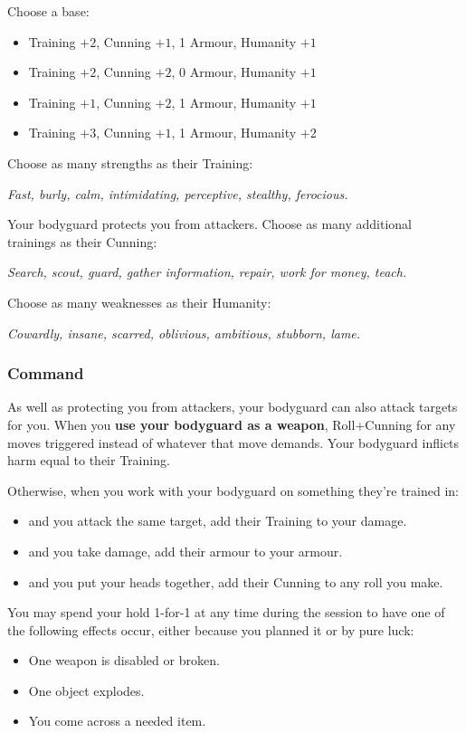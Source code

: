 Choose a base:
\begin{itemize}
\item Training $+2$, Cunning $+1$, 1 Armour, Humanity $+1$
\item Training $+2$, Cunning $+2$, 0 Armour, Humanity $+1$
\item Training $+1$, Cunning $+2$, 1 Armour, Humanity $+1$
\item Training $+3$, Cunning $+1$, 1 Armour, Humanity $+2$
\end{itemize}

Choose as many strengths as their Training:

\textit{Fast, burly, calm, intimidating, perceptive, stealthy, ferocious.}

Your bodyguard protects you from attackers. Choose as many additional trainings as their Cunning:

\textit{Search, scout, guard, gather information, repair, work for money, teach.}

Choose as many weaknesses as their Humanity:

\textit{Cowardly, insane, scarred, oblivious, ambitious, stubborn, lame.}

\subsubsection{Command}\label{sec:Command}
As well as protecting you from attackers, your bodyguard can also attack targets for you. When you \textbf{use your bodyguard as a weapon}, Roll+Cunning for any moves triggered instead of whatever that move demands. Your bodyguard inflicts harm equal to their Training.

Otherwise, when you work with your bodyguard on something they're trained in:
\begin{itemize}
\item and you attack the same target, add their Training to your damage.
\item and you take damage, add their armour to your armour.
\item and you put your heads together, add their Cunning to any roll you make.
\end{itemize}


You may spend your hold 1-for-1 at any time during the session to have one of the following effects occur, either because you planned it or by pure luck:
\begin{itemize}
\item One weapon is disabled or broken.
\item One object explodes.
\item You come across a needed item.
\end{itemize}

